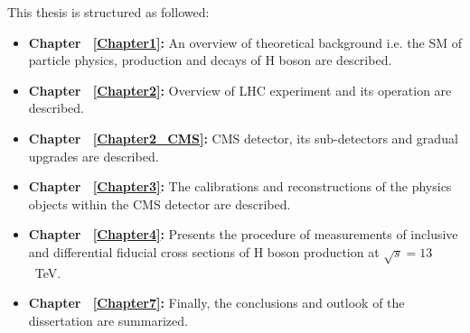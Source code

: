 
\par This thesis is structured as followed:
\begin{itemize}
	\item \textbf{Chapter  ~\ref{Chapter1}:  } An overview of theoretical background i.e. the SM of particle physics, production and decays of H boson are described.%
	\item \textbf{Chapter ~\ref{Chapter2}: } Overview of LHC experiment and its operation are described. 
	\item \textbf{Chapter ~\ref{Chapter2_CMS}: } CMS detector, its sub-detectors and gradual upgrades are described. %
	\item \textbf{Chapter ~\ref{Chapter3}: } The calibrations and reconstructions of the  physics objects within the CMS detector are described. %
        \item \textbf{Chapter ~\ref{Chapter4}: } Presents the procedure of measurements of inclusive and differential fiducial cross sections of H boson production at $\sqrt{s} = 13$~TeV.
	\item \textbf{Chapter ~\ref{Chapter7}: } Finally, the conclusions and outlook of the dissertation are summarized.
\end{itemize}
		
